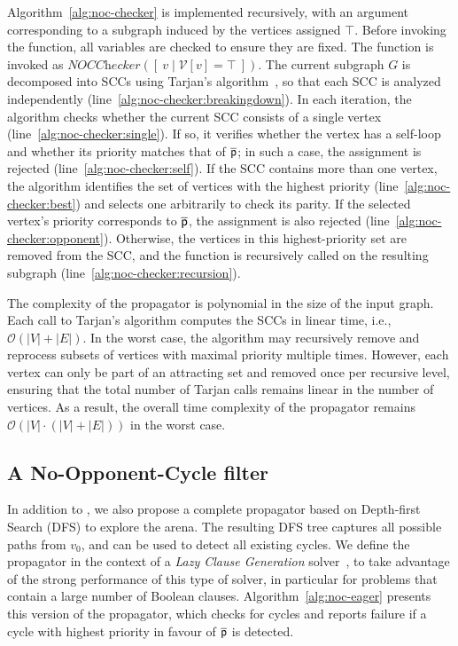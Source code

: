 \documentclass[runningheads]{llncs}
\begin{document}
Algorithm~\ref{alg:noc-checker} is implemented recursively, with an argument corresponding to a subgraph induced by the vertices assigned $\top$. Before invoking the function, all variables are checked to ensure they are fixed. The function is invoked as $\textit{NOCChecker}([\ { v \mid \mathcal{V}[v] = \top }\ ])$. The current subgraph $G$ is decomposed into SCCs using Tarjan’s algorithm~\cite{Tarjan:1972}, so that each SCC is analyzed independently (line~\ref{alg:noc-checker:breakingdown}).
%
In each iteration, the algorithm checks whether the current SCC consists of a single vertex (line~\ref{alg:noc-checker:single}). If so, it verifies whether the vertex has a self-loop and whether its priority matches that of $\overline{\mathsf{p}}$; in such a case, the assignment is rejected (line~\ref{alg:noc-checker:self}).
%
If the SCC contains more than one vertex, the algorithm identifies the set of vertices with the highest priority (line~\ref{alg:noc-checker:best}) and selects one arbitrarily to check its parity. If the selected vertex’s priority corresponds to $\overline{\mathsf{p}}$, the assignment is also rejected (line~\ref{alg:noc-checker:opponent}). Otherwise, the vertices in this highest-priority set are removed from the SCC, and the function is recursively called on the resulting subgraph (line~\ref{alg:noc-checker:recursion}).

The complexity of the \nocchecker propagator is polynomial in the size of the input graph. Each call to Tarjan's algorithm computes the SCCs in linear time, i.e., $\mathcal{O}(|V| + |E|)$. In the worst case, the algorithm may recursively remove and reprocess subsets of vertices with maximal priority multiple times. However, each vertex can only be part of an attracting set and removed once per recursive level, ensuring that the total number of Tarjan calls remains linear in the number of vertices. As a result, the overall time complexity of the propagator remains $\mathcal{O}(|V| \cdot (|V| + |E|))$ in the worst case.

\subsection{A No-Opponent-Cycle filter} \label{sec:nocfilter}
In addition to \nocchecker, we also propose a complete propagator based on Depth-first Search (DFS) to explore the arena. The resulting DFS tree captures all possible paths from $v_0$, and can be used to detect all existing cycles. We define the propagator in the context of a \textit{Lazy Clause Generation} solver~\cite{DBLP:journals/constraints/OhrimenkoSC09}, to take advantage of the strong performance of this type of solver, in particular for problems that contain a large number of Boolean clauses. Algorithm~\ref{alg:noc-eager} presents this version of the propagator, which checks for cycles and reports failure if a cycle with highest priority in favour of $\overline{\mathsf{p}}$ is detected.
\end{document}
